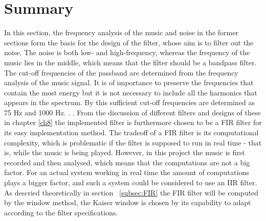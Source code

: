 \section{Summary} \label{sec:filtervalg}
In this section, the frequency analysis of the music and noise in the former sections form the basis for the design of the filter, whose aim is to filter out the noise. The noise is both low- and high-frequency, whereas the frequency of the music lies in the middle, which means that the filter should be a bandpass filter. The cut-off frequencies of the passband are determined from the frequency analysis of the music signal. It is of importance to preserve the frequencies that contain the most energy but it is not necessary to include all the harmonics that appears in the spectrum. By this sufficient cut-off frequencies are determined as 75 Hz and 1000 Hz. . .
From the discussion of different filters and designs of these in chapter \ref{ch8} the implemented filter is furthermore chosen to be a FIR filter for its easy implementation method. The tradeoff of a FIR filter is its computational complexity, which is problematic if the filter is supposed to run in real time - that is, while the music is being played. However, in this project the music is first recorded and then analysed, which means that the computations are not a big factor. For an actual system working in real time the amount of computations plays a bigger factor, and such a system could be considered to use an IIR filter.\\
As descried theoretically in section ~\ref{subsec:FIR} the FIR filter will be computed by the window method, the Kaiser window is chosen by its capability to adapt according to the filter specifications.     